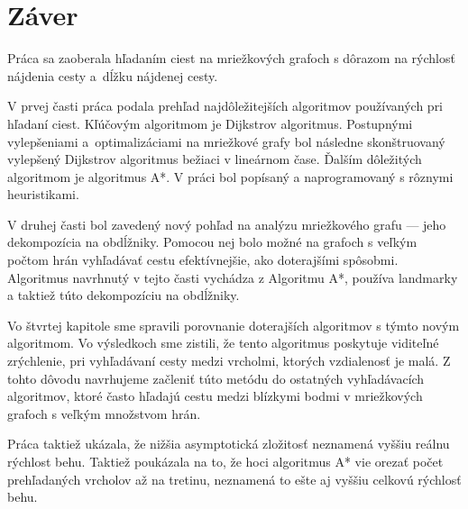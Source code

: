 \chapter*{Záver}

Práca sa zaoberala hľadaním ciest na mriežkových grafoch s dôrazom na rýchlosť nájdenia cesty a~dĺžku nájdenej cesty. 

V prvej časti práca podala prehľad najdôležitejších algoritmov používaných pri hľadaní ciest. Kľúčovým algoritmom je Dijkstrov algoritmus. Postupnými vylepšeniami a~optimalizáciami na mriežkové grafy bol následne skonštruovaný vylepšený Dijkstrov algoritmus bežiaci v lineárnom čase. 
Ďalším dôležitých algoritmom je algoritmus A*. V práci bol popísaný a naprogramovaný s rôznymi heuristikami.

V druhej časti bol zavedený nový pohľad na analýzu mriežkového grafu --- jeho dekompozícia na obdĺžniky. 
Pomocou nej bolo možné na grafoch s veľkým počtom hrán vyhľadávať cestu efektívnejšie, ako doterajšími spôsobmi.
Algoritmus navrhnutý v tejto časti vychádza z Algoritmu A*, používa landmarky a taktiež túto dekompozíciu na obdĺžniky.

Vo štvrtej kapitole sme spravili porovnanie doterajších algoritmov s týmto novým algoritmom. Vo výsledkoch sme zistili, 
že tento algoritmus poskytuje viditeľné zrýchlenie, pri vyhľadávaní cesty medzi vrcholmi, ktorých vzdialenosť je malá. Z tohto dôvodu navrhujeme začleniť túto metódu do ostatných vyhľadávacích algoritmov, ktoré často hľadajú cestu medzi blízkymi bodmi v mriežkových grafoch s veľkým množstvom hrán.

Práca taktiež ukázala, že nižšia asymptotická zložitosť neznamená vyššiu reálnu rýchlost behu. Taktiež poukázala na to, že hoci algoritmus A* vie orezať počet prehľadaných vrcholov až na tretinu, neznamená to ešte aj vyššiu celkovú rýchlosť behu.
